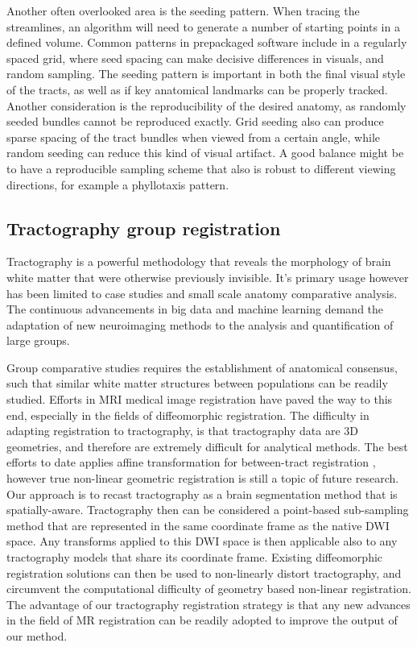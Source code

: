 Another often overlooked area is the seeding pattern. When tracing the streamlines, an algorithm will need to generate a number of starting points in a defined volume. Common patterns in prepackaged software include in a regularly spaced grid, where seed spacing can make decisive differences in visuals, and random sampling. The seeding pattern is important in both the final visual style of the tracts, as well as if key anatomical landmarks can be properly tracked. Another consideration is the reproducibility of the desired anatomy, as randomly seeded bundles cannot be reproduced exactly. Grid seeding also can produce sparse spacing of the tract bundles when viewed from a certain angle, while random seeding can reduce this kind of visual artifact. A good balance might be to have a reproducible sampling scheme that also is robust to different viewing directions, for example a phyllotaxis pattern.

\subsection{Tractography group registration}
Tractography is a powerful methodology that reveals the morphology of brain white matter that were otherwise previously invisible. It's primary usage however has been limited to case studies and small scale anatomy comparative analysis. The continuous advancements in big data and machine learning demand the adaptation of new neuroimaging methods to the analysis and quantification of large groups.

Group comparative studies requires the establishment of anatomical consensus, such that similar white matter structures between populations can be readily studied. Efforts in MRI medical image registration have paved the way to this end, especially in the fields of diffeomorphic registration. The difficulty in adapting registration to tractography, is that tractography data are 3D geometries, and therefore are extremely difficult for analytical methods. The best efforts to date applies affine transformation for between-tract registration \cite{Garyfallidis2015}, however true non-linear geometric registration is still a topic of future research. Our approach is to recast tractography as a brain segmentation method that is spatially-aware. Tractography then can be considered a point-based sub-sampling method that are represented in the same coordinate frame as the native DWI space. Any transforms applied to this DWI space is then applicable also to any tractography models that share its coordinate frame. Existing diffeomorphic registration solutions can then be used to non-linearly distort tractography, and circumvent the computational difficulty of geometry based non-linear registration. The advantage of our tractography registration strategy is that any new advances in the field of MR registration can be readily adopted to improve the output of our method. 

